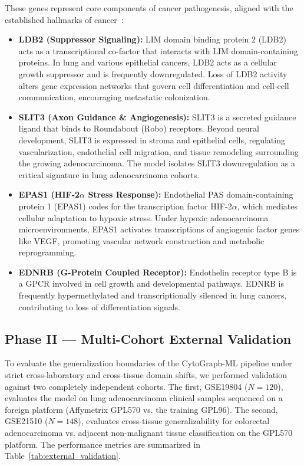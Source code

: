 \documentclass[journal,10pt]{IEEEtran}
\begin{document}
These genes represent core components of cancer pathogenesis, aligned with the established hallmarks of cancer~\cite{hallmarks}:
\begin{itemize}
    \item \textbf{LDB2 (Suppressor Signaling):} LIM domain binding protein 2 (LDB2) acts as a transcriptional co-factor that interacts with LIM domain-containing proteins. In lung and various epithelial cancers, LDB2 acts as a cellular growth suppressor and is frequently downregulated. Loss of LDB2 activity alters gene expression networks that govern cell differentiation and cell-cell communication, encouraging metastatic colonization.
    \item \textbf{SLIT3 (Axon Guidance \& Angiogenesis):} SLIT3 is a secreted guidance ligand that binds to Roundabout (Robo) receptors. Beyond neural development, SLIT3 is expressed in stroma and epithelial cells, regulating vascularization, endothelial cell migration, and tissue remodeling surrounding the growing adenocarcinoma. The model isolates SLIT3 downregulation as a critical signature in lung adenocarcinoma cohorts.
    \item \textbf{EPAS1 (HIF-2$\alpha$ Stress Response):} Endothelial PAS domain-containing protein 1 (EPAS1) codes for the transcription factor HIF-2$\alpha$, which mediates cellular adaptation to hypoxic stress. Under hypoxic adenocarcinoma microenvironments, EPAS1 activates transcriptions of angiogenic factor genes like VEGF, promoting vascular network construction and metabolic reprogramming.
    \item \textbf{EDNRB (G-Protein Coupled Receptor):} Endothelin receptor type B is a GPCR involved in cell growth and developmental pathways. EDNRB is frequently hypermethylated and transcriptionally silenced in lung cancers, contributing to loss of differentiation signals.
\end{itemize}

\subsection{Phase II --- Multi-Cohort External Validation}
To evaluate the generalization boundaries of the CytoGraph-ML pipeline under strict cross-laboratory and cross-tissue domain shifts, we performed validation against two completely independent cohorts. The first, GSE19804 ($N=120$), evaluates the model on lung adenocarcinoma clinical samples sequenced on a foreign platform (Affymetrix GPL570 vs. the training GPL96). The second, GSE21510 ($N=148$), evaluates cross-tissue generalizability for colorectal adenocarcinoma vs. adjacent non-malignant tissue classification on the GPL570 platform. The performance metrics are summarized in Table~\ref{tab:external_validation}.
\end{document}
